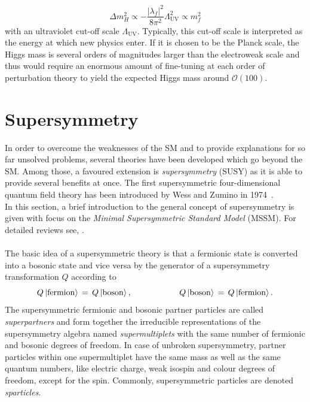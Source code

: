 \begin{description}
\begin{equation}
\label{eq:hierarchy}
\Delta m_H^2 \propto -\frac{|\lambda_f|^2}{8\pi^2}\Lambda_\mathrm{UV}^2 \propto m_f^2
\end{equation}
 with an ultraviolet cut-off scale $\Lambda_\mathrm{UV}$. Typically, this cut-off scale is interpreted as the energy at which new physics enter. If it is chosen to be the Planck scale, the Higgs mass is several orders of magnitudes larger than the electroweak scale and thus would require an enormous amount of fine-tuning at each order of perturbation theory to yield the expected Higgs mass around $\mathcal{O}(100)$\gev. 
\end{description} 

\section{Supersymmetry}
\label{sec:susy}
In order to overcome the weaknesses of the SM and to provide explanations for so far unsolved problems, several theories have been developed which go beyond the SM. Among those, a favoured extension is \textit{supersymmetry} (SUSY) as it is able to provide several benefits at once. The first supersymmetric four-dimensional quantum field theory has been introduced by Wess and Zumino in 1974~\cite{bib:WessZumino}. \\
In this section, a brief introduction to the general concept of supersymmetry is given with focus on the \textit{Minimal Supersymmetric Standard Model} (MSSM). For detailed reviews see, \eg\cite{Aitchison:2005cf, Martin:1997ns}.\\ 
\\
The basic idea of a supersymmetric theory is that a fermionic state is converted into a bosonic state and vice versa by the generator of a supersymmetry transformation $Q$ according to
\begin{equation*}
Q \ket{\mathrm{fermion}} \, = \, Q \ket{\mathrm{boson}}, \hspace{20mm} Q \ket{\mathrm{boson}} \, = \, Q \ket{\mathrm{fermion}}.
\end{equation*}
The supersymmetric fermionic and bosonic partner particles are called \textit{superpartners} and form together the irreducible representations of the supersymmetry algebra named \textit{supermultiplets} with the same number of fermionic and bosonic degrees of freedom. In case of unbroken supersymmetry, partner particles within one supermultiplet have the same mass as well as the same quantum numbers, like electric charge, weak isospin and colour degrees of freedom, except for the spin. Commonly, supersymmetric particles are denoted \textit{sparticles}. \\
